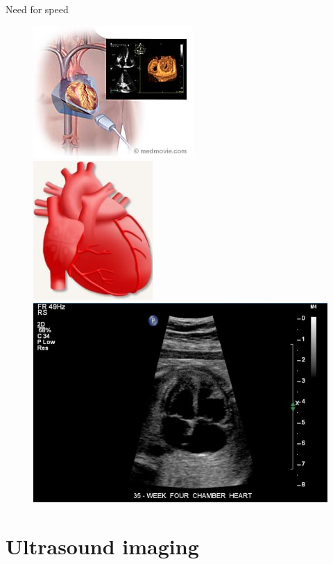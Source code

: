 \documentclass[t,12pt,english
\ifx\beamermode\undefined\else,\beamermode\fi
]{beamer}
\begin{document}
\begin{frame}{Need for speed}
\begin{figure}[!htb]
\includegraphics[width=.6\textwidth]{5.jpg}\\
\endminipage
{}
\centering
\includegraphics[width=.6\textwidth]{3.jpg}\\
\includegraphics[width=.6\textwidth]{4.jpg}\\


\endminipage
\end{figure}
\end{frame}

\section{Ultrasound imaging}
\end{document}
